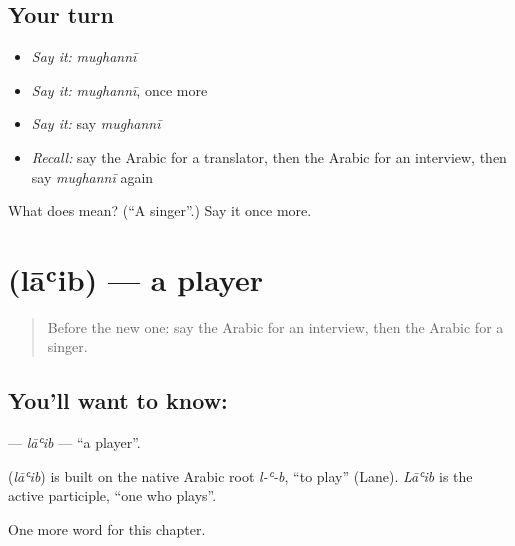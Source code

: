 \subsection*{Your turn}
\begin{itemize}
\raggedright
  \item \emph{Say it:} \emph{mughannī}
  \item \emph{Say it:} \emph{mughannī}, once more
  \item \emph{Say it:} say \emph{mughannī}
  \item \emph{Recall:} say the Arabic for a translator, then the Arabic for an interview, then say \emph{mughannī} again
\end{itemize}

\begin{tcolorbox}[breakable,colback=teal!4,colframe=teal!35!black,title={Before you move on}]
What does  mean? (\textquotedblleft{}A singer\textquotedblright{}.) Say it once more.
\end{tcolorbox}
\section[\texorpdfstring{\ar{لاعب} (lāʿib)}{لاعب (lāʿib)}]{ (lāʿib) — a player}

\label{lesson:AR-C190-laib}



\begin{quote}
Before the new one: say the Arabic for an interview, then the Arabic for a singer.
\end{quote}

\subsection*{You'll want to know: }
\textbf{} — \emph{lāʿib} — \textquotedblleft{}a player\textquotedblright{}.

\begin{cousinweb}
\textbf{} (\emph{lāʿib}) is built on the native Arabic root \emph{l-ʿ-b}, \textquotedblleft{}to play\textquotedblright{} (Lane). \emph{Lāʿib} is the active participle, \textquotedblleft{}one who plays\textquotedblright{}.
\end{cousinweb}

\begin{grammarlens}[title={What you've built}]
One more word for this chapter.
\end{grammarlens}

